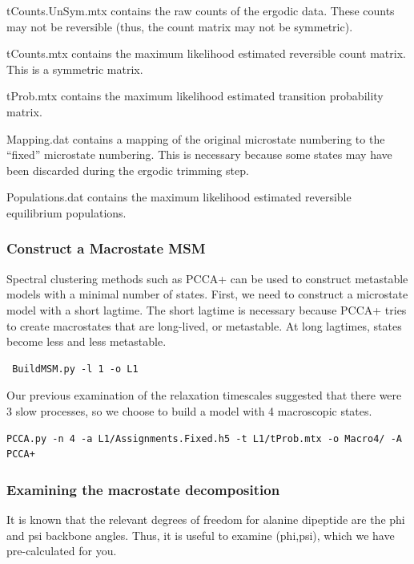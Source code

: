 \documentclass[12pt]{article}
\begin{document}
tCounts.UnSym.mtx contains the raw counts of the ergodic data.  These counts may not be reversible (thus, the count matrix may not be symmetric).  

tCounts.mtx contains the maximum likelihood estimated reversible count matrix.  This is a symmetric matrix.  

tProb.mtx contains the maximum likelihood estimated transition probability matrix.  

Mapping.dat contains a mapping of the original microstate numbering to the “fixed” microstate numbering.  This is necessary because some states may have been discarded during the ergodic trimming step.  

Populations.dat contains the maximum likelihood estimated reversible equilibrium populations.  

\subsubsection{Construct a Macrostate MSM}

Spectral clustering methods such as PCCA+  \cite{Deuflhard2000, Deuflhard2005, kube2007coarse} can be used to construct metastable models with a minimal number of states.  First, we need to construct a microstate model with a short lagtime.  The short lagtime is necessary because PCCA+ tries to create macrostates that are long-lived, or metastable.  At long lagtimes, states become less and less metastable.

\begin{verbatim}
 BuildMSM.py -l 1 -o L1
\end{verbatim}

Our previous examination of the relaxation timescales suggested that there were 3 slow processes, so we choose to build a model with 4 macroscopic states.  

\begin{verbatim}
PCCA.py -n 4 -a L1/Assignments.Fixed.h5 -t L1/tProb.mtx -o Macro4/ -A PCCA+
\end{verbatim}

\subsubsection{Examining the macrostate decomposition}

It is known that the relevant degrees of freedom for alanine dipeptide are the phi and psi backbone angles.  Thus, it is useful to examine (phi,psi), which we have pre-calculated for you.
\end{document}
